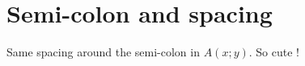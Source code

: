 \documentclass[12pt,a4paper]{article}
\begin{document}
\section{Semi-colon and spacing}

\begin{tcblisting}{}
Same spacing around the semi-colon in $A(x;y)$. So cute !
\end{tcblisting}
\end{document}
